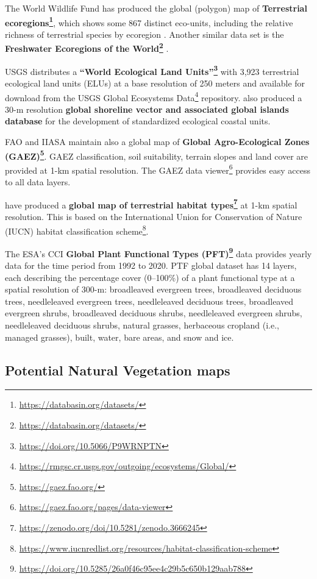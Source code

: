 \documentclass[
  graybox,natbib,nospthms]{svmono}
\renewcommand{\href}[2]{#2 (\url{#1})}
\renewcommand{\href}[2]{#2\footnote{\url{#1}}}
\begin{document}
The World Wildlife Fund has produced the global (polygon) map of \textbf{\href{https://databasin.org/datasets/}{Terrestrial ecoregions}},
which shows some 867 distinct eco-units, including the relative richness of terrestrial
species by ecoregion \citep{olson2001terrestrial}. Another similar data set is the
\textbf{\href{https://databasin.org/datasets/}{Freshwater Ecoregions of the World}} \citep{abell2008freshwater}.

USGS distributes a \textbf{\href{https://doi.org/10.5066/P9WRNPTN}{``World Ecological Land Units''}} with 3,923 terrestrial ecological land units (ELUs)
at a base resolution of 250 meters and available for \href{https://rmgsc.cr.usgs.gov/outgoing/ecosystems/Global/}{download from the USGS Global Ecosystems Data} repository.
\citet{sayre2019new} also produced a 30-m resolution \textbf{global shoreline vector and associated global islands database}
for the development of standardized ecological coastal units.

FAO and IIASA maintain also a global map of \textbf{\href{https://gaez.fao.org/}{Global Agro-Ecological Zones (GAEZ)}}.
GAEZ classification, soil suitability, terrain slopes and land cover are provided at 1-km spatial resolution.
The \href{https://gaez.fao.org/pages/data-viewer}{GAEZ data viewer} provides easy access to all data layers.

\citet{Jung2020} have produced a \textbf{\href{https://zenodo.org/doi/10.5281/zenodo.3666245}{global map of terrestrial habitat types}} at 1-km spatial resolution.
This is based on the International Union for Conservation of Nature (IUCN) \href{https://www.iucnredlist.org/resources/habitat-classification-scheme}{habitat classification scheme}.

The ESA's CCI \textbf{\href{https://doi.org/10.5285/26a0f46c95ee4c29b5c650b129aab788}{Global Plant Functional Types (PFT)}} data provides yearly data
for the time period from 1992 to 2020. PTF global dataset has 14 layers, each describing
the percentage cover (0--100\%) of a plant functional type at a spatial resolution of 300-m:
broadleaved evergreen trees, broadleaved deciduous trees, needleleaved evergreen trees,
needleleaved deciduous trees, broadleaved evergreen shrubs, broadleaved deciduous shrubs,
needleleaved evergreen shrubs, needleleaved deciduous shrubs, natural grasses,
herbaceous cropland (i.e., managed grasses), built, water, bare areas, and snow and ice.

\hypertarget{potential-natural-vegetation-maps}{%
\subsection{Potential Natural Vegetation maps}\label{potential-natural-vegetation-maps}}
\end{document}
